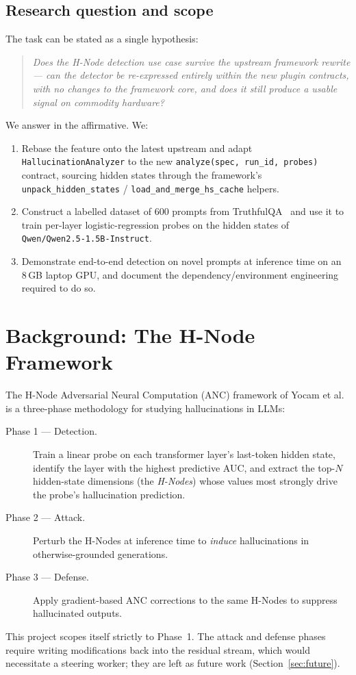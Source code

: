 \documentclass[11pt]{article}
\begin{document}
\subsection{Research question and scope}
The task can be stated as a single hypothesis:
\begin{quote}\itshape
Does the H-Node detection use case survive the upstream framework rewrite --- can the
detector be re-expressed entirely within the new plugin contracts, with no changes to the
framework core, and does it still produce a usable signal on commodity hardware?
\end{quote}
We answer in the affirmative. We:
\begin{enumerate}
  \item Rebase the feature onto the latest upstream and adapt \texttt{HallucinationAnalyzer}
  to the new \texttt{analyze(spec, run\_id, probes)} contract, sourcing hidden states through
  the framework's \texttt{unpack\_hidden\_states} / \texttt{load\_and\_merge\_hs\_cache}
  helpers.
  \item Construct a labelled dataset of 600 prompts from TruthfulQA~\cite{truthfulqa} and use
  it to train per-layer logistic-regression probes on the hidden states of
  \texttt{Qwen/Qwen2.5-1.5B-Instruct}.
  \item Demonstrate end-to-end detection on novel prompts at inference time on an 8\,GB
  laptop GPU, and document the dependency/environment engineering required to do so.
\end{enumerate}

\section{Background: The H-Node Framework}

The H-Node Adversarial Neural Computation (ANC) framework of Yocam et al.~\cite{hnode} is a
three-phase methodology for studying hallucinations in LLMs:
\begin{description}
  \item[Phase 1 --- Detection.] Train a linear probe on each transformer layer's last-token
  hidden state, identify the layer with the highest predictive AUC, and extract the top-$N$
  hidden-state dimensions (the \emph{H-Nodes}) whose values most strongly drive the probe's
  hallucination prediction.
  \item[Phase 2 --- Attack.] Perturb the H-Nodes at inference time to \emph{induce}
  hallucinations in otherwise-grounded generations.
  \item[Phase 3 --- Defense.] Apply gradient-based ANC corrections to the same H-Nodes to
  suppress hallucinated outputs.
\end{description}
This project scopes itself strictly to Phase~1. The attack and defense phases require writing
modifications back into the residual stream, which would necessitate a steering worker; they
are left as future work (Section~\ref{sec:future}).
\end{document}
